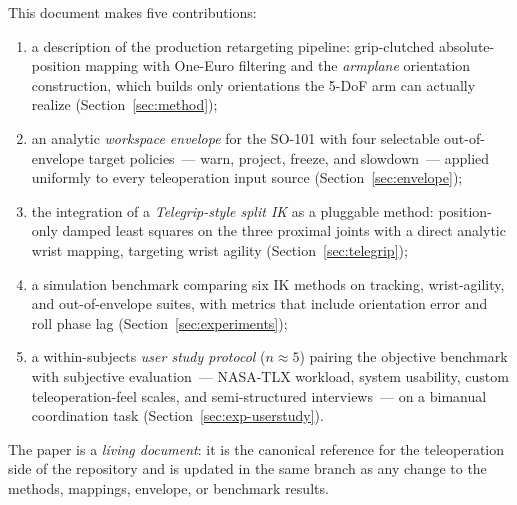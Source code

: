 This document makes five contributions:
\begin{enumerate}
  \item a description of the production retargeting pipeline: grip-clutched
        absolute-position mapping with One-Euro filtering and the
        \emph{armplane} orientation construction, which builds only
        orientations the 5-DoF arm can actually realize
        (Section~\ref{sec:method});
  \item an analytic \emph{workspace envelope} for the SO-101 with four
        selectable out-of-envelope target policies~--- warn, project,
        freeze, and slowdown~--- applied uniformly to every teleoperation
        input source (Section~\ref{sec:envelope});
  \item the integration of a \emph{Telegrip-style split IK}
        \citep{telegrip} as a pluggable method: position-only damped least
        squares on the three proximal joints with a direct analytic wrist
        mapping, targeting wrist agility (Section~\ref{sec:telegrip});
  \item a simulation benchmark comparing six IK methods on tracking,
        wrist-agility, and out-of-envelope suites, with metrics that
        include orientation error and roll phase lag
        (Section~\ref{sec:experiments});
  \item a within-subjects \emph{user study protocol} (\(n\approx 5\))
        pairing the objective benchmark with subjective evaluation~---
        NASA-TLX workload, system usability, custom teleoperation-feel
        scales, and semi-structured interviews~--- on a bimanual
        coordination task (Section~\ref{sec:exp-userstudy}).
\end{enumerate}

The paper is a \emph{living document}: it is the canonical reference for the
teleoperation side of the repository and is updated in the same branch as
any change to the methods, mappings, envelope, or benchmark results.
